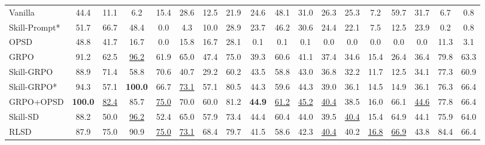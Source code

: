 \begin{table}[ht!]
{\begin{tabular}{l ccccccc cccccccc cc}
    Vanilla
        & 44.4 & 11.1 & 6.2 & 15.4 & 28.6 & 12.5 & 21.9
        & 24.6 & 48.1 & 31.0 & 26.3 & 25.3 & 7.2 & 59.7 & 31.7
        & 6.7 & 0.8
        \\
    Skill-Prompt*
        & 51.7 & 66.7 & 48.4 & 0.0 & 4.3 & 10.0 & 28.9
        & 23.7 & 46.2 & 30.6 & 24.4 & 22.1 & 7.5 & 12.5 & 23.9
        & 0.2 & 0.8
        \\
    OPSD
        & 48.8 & 41.7 & 16.7 & 0.0 & 15.8 & 16.7 & 28.1
        & 0.1 & 0.1 & 0.1 & 0.0 & 0.0 & 0.0 & 0.0 & 0.0
        & 11.3 & 3.1
        \\
    GRPO
        & 91.2 & 62.5 & \cellcolor{secondcolor}\underline{96.2}
        & 61.9 & 65.0 & 47.4 & 75.0
        & 39.3 & 60.6 & 41.1 & 37.4 & 34.6 & 15.4 & 26.4 & 36.4
        & 79.8 & 63.3
        \\
    Skill-GRPO
        & 88.9 & 71.4 & 58.8 & 70.6 & 40.7 & 29.2 & 60.2
        & 43.5 & 58.8 & 43.0 & 36.8 & 32.2 & 11.7 & 12.5 & 34.1
        & 77.3 & 60.9
        \\
    Skill-GRPO*
        & 94.3 & 57.1 & \cellcolor{topcolor}\textbf{100.0}
        & 66.7 & \cellcolor{secondcolor}\underline{73.1}
        & 57.1 & 80.5
        & 44.3 & 59.6 & 44.3 & 39.0 & 36.1 & 14.5 & 14.9 & 36.1
        & 76.3 & 66.4
        \\
    GRPO+OPSD
        & \cellcolor{topcolor}\textbf{100.0}
        & \cellcolor{secondcolor}\underline{82.4}
        & 85.7
        & \cellcolor{secondcolor}\underline{75.0}
        & 70.0 & 60.0 & 81.2
        & \cellcolor{topcolor}\textbf{44.9}
        & \cellcolor{secondcolor}\underline{61.2}
        & \cellcolor{secondcolor}\underline{45.2}
        & \cellcolor{secondcolor}\underline{40.4}
        & 38.5 & 16.0 & 66.1
        & \cellcolor{secondcolor}\underline{44.6}
        & 77.8 & 66.4
        \\
    Skill-SD
        & 88.2 & 50.0 & \cellcolor{secondcolor}\underline{96.2}
        & 52.4 & 65.0 & 57.9 & 73.4
        & 44.4 & 60.4 & 44.0 & 39.5
        & \cellcolor{secondcolor}\underline{40.4}
        & 15.4 & 64.9 & 44.1
        & 75.9 & 64.0
        \\
    RLSD
        & 87.9 & 75.0 & 90.9
        & \cellcolor{secondcolor}\underline{75.0}
        & \cellcolor{secondcolor}\underline{73.1}
        & 68.4 & 79.7
        & 41.5 & 58.6 & 42.3
        & \cellcolor{secondcolor}\underline{40.4}
        & 40.2
        & \cellcolor{secondcolor}\underline{16.8}
        & \cellcolor{secondcolor}\underline{66.9}
        & 43.8
        & 84.4 & 66.4
        \\

\end{tabular}}
\end{table}
